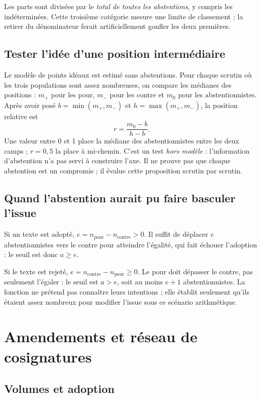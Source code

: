 \documentclass[11pt,a4paper]{article}
\begin{document}
Les parts sont divisées par le \emph{total de toutes les abstentions}, y compris
les indéterminées. Cette troisième catégorie mesure une limite de classement ;
la retirer du dénominateur ferait artificiellement gonfler les deux premières.

\subsection{Tester l'idée d'une position intermédiaire}

Le modèle de points idéaux est estimé sans abstentions. Pour chaque scrutin où
les trois populations sont assez nombreuses, on compare les médianes des
positions : $m_+$ pour les pour, $m_-$ pour les contre et $m_0$ pour les
abstentionnistes. Après avoir posé $b=\min(m_+,m_-)$ et $h=\max(m_+,m_-)$, la
position relative est
\[
 r=\frac{m_0-b}{h-b}.
\]
Une valeur entre 0 et 1 place la médiane des abstentionnistes entre les deux
camps ; $r=0{,}5$ la place à mi-chemin. C'est un test \emph{hors modèle} :
l'information d'abstention n'a pas servi à construire l'axe. Il ne prouve pas
que chaque abstention est un compromis ; il évalue cette proposition scrutin
par scrutin.

\subsection{Quand l'abstention aurait pu faire basculer l'issue}

Si un texte est adopté, $e=n_{\mathrm{pour}}-n_{\mathrm{contre}}>0$. Il suffit
de déplacer $e$ abstentionnistes vers le contre pour atteindre l'égalité, qui
fait échouer l'adoption : le seuil est donc $a\geq e$.

Si le texte est rejeté, $e=n_{\mathrm{contre}}-n_{\mathrm{pour}}\geq0$. Le pour
doit dépasser le contre, pas seulement l'égaler : le seuil est $a>e$, soit au
moins $e+1$ abstentionnistes. La fonction ne prétend pas connaître leurs
intentions ; elle établit seulement qu'ils étaient assez nombreux pour modifier
l'issue sous ce scénario arithmétique.

\section{Amendements et réseau de cosignatures}

\subsection{Volumes et adoption}
\end{document}
